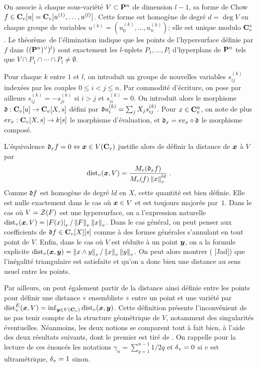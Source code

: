 \documentclass[11pt, twoside, a4paper]{article}
\theoremstyle{remark}
\begin{document}
On associe à chaque sous-variété $V \subset \mathbf{P}^n$ de dimension $l-1$, sa forme de Chow $f \in \mathbf{C}_v[u] = \mathbf{C}_v[u^{(1)}, \dots, u^{(l)}]$. Cette forme est homogène de degré $d = \deg V$ en chaque groupe de variables $u^{(k)} = (u^{(k)}_0, \dots, u^{(k)}_n)$; elle est unique modulo $\mathbf{C}_v^{*}$. Le théorème~de l'élimination indique que les points de l'hypersurface définie par $f$ dans $((\mathbf{P}^n)^\vee)^l)$ sont exactement les $l$-uplets $P_1, \dots, P_l$ d'hyperplans de $\mathbf{P}^n$ tels que $V \cap P_1 \cap \cdots \cap P_l \neq \emptyset$.

Pour chaque $k$ entre $1$ et $l$, on introduit un groupe de nouvelles variables $s^{(k)}_{ij}$ indexées par les couples $0 \le i < j \le n$. Par commodité d'écriture, on pose par ailleurs $s^{(k)}_{ij} = - s^{(k)}_{ji}$ si $i > j$ et $s^{(k)}_{ii} = 0$. On introduit alors le morphisme $\mathfrak{d} : \mathbf{C}_v[u] \to \mathbf{C}_v[X, s]$ défini par $\mathfrak{d} u^{(k)}_i = \sum_j X_j s^{(k)}_{ij}$. Pour $x \in \mathbf{C}_v^n$, on note de plus $ev_x : \mathbf{C}_v[X, s] \to k[s]$ le morphisme d'évaluation, et $\mathfrak{d}_x = ev_x \circ \mathfrak{d}$ le morphisme composé.

L'équivalence $\mathfrak{d}_x f = 0 \Leftrightarrow \boldsymbol{x} \in V(\mathbf{C}_v)$ justifie alors de définir la distance de $\boldsymbol{x}$ à $V$ par
\[
 \mathrm{dist}_v(\boldsymbol{x}, V) = \frac{M_v(\mathfrak{d}_x f)}{M_v(f) \left\lVert x\right\rVert_{v} ^{ld}} \text{ .}
\]
Comme $\mathfrak{d} f$ est homogène de degré $ld$ en $X$, cette quantité est bien définie. Elle est nulle exactement dans le cas où $\boldsymbol{x} \in V$ et est toujours majorée par~$1$. Dans le cas où $V = \mathcal Z(F)$ est une hypersurface, on a l'expression naturelle $\mathrm{dist}_v(\boldsymbol{x}, V) = \left\lvert F(x)\right\rvert_{v} / \left\lVert F\right\rVert_{v} \left\lVert x\right\rVert_{v}$. Dans le cas général, on peut penser aux coefficients de $\mathfrak{d} f \in \mathbf{C}_v[X][s]$ comme à des formes générales s'annulant en tout point de $V$. Enfin, dans le cas où $V$ est réduite à un point $\boldsymbol{y}$, on a la formule explicite $\mathrm{dist}_v (\boldsymbol{x}, \boldsymbol{y}) = \left\lVert x \wedge y\right\rVert_{v} / \left\lVert x\right\rVert_{v} \left\lVert y\right\rVert_{v}$. On peut alors montrer ( [Jad]) que l'inégalité triangulaire est satisfaite et qu'on a donc bien une distance au sens usuel entre les points.

Par ailleurs, on peut également partir de la distance ainsi définie entre les points pour définir une distance « ensembliste » entre un point et une variété par $\mathrm{dist}_v^E(\boldsymbol{x}, V) = \inf_{\boldsymbol{y} \in V(\mathbf{C}_v)} \mathrm{dist}_v(\boldsymbol{x}, \boldsymbol{y})$. Cette définition présente l'inconvénient de ne pas tenir compte de la structure géométrique de $V$, notamment des singularités éventuelles. Néanmoins, les deux notions se comparent tout à fait bien, à l'aide des deux résultats suivants, dont le premier est tiré de \cite[« Closest point property » p.~103]{phi1}. On rappelle pour la lecture de ces énoncés les notations $\gamma_n = \sum_{q=1}^{n-1} 1/2q$ et ${\delta\smash{_v}} = 0$ si $v$ est ultramétrique, ${\delta\smash{_v}} = 1$ sinon.
\end{document}
